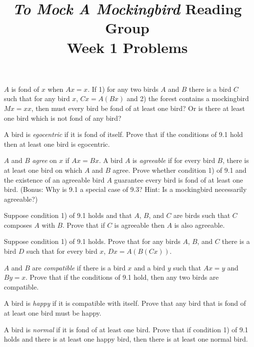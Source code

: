 \documentclass[12pt, letterpaper]{article}
\title{\emph{To Mock A Mockingbird} Reading Group\\Week 1 Problems}
\begin{document}
\maketitle

\disclaimer

\begin{prob}{9.1}
$A$ is fond of $x$ when $Ax = x$. If 1) for any two birds $A$ and $B$ there is a bird $C$ such that for any bird $x$, $Cx = A(Bx)$ and 2) the forest contains a mockingbird $Mx = xx$, then must every bird be fond of at least one bird? Or is there at least one bird which is not fond of any bird?
\end{prob}

\begin{prob}{9.2}
A bird is \emph{egocentric} if it is fond of itself. Prove that if the conditions of 9.1 hold then at least one bird is egocentric.
\end{prob}

\begin{prob}{9.3}
$A$ and $B$ \emph{agree} on $x$ if $Ax = Bx$. A bird $A$ is \emph{agreeable} if for every bird $B$, there is at least one bird on which $A$ and $B$ agree. Prove whether condition 1) of 9.1 and the existence of an agreeable bird $A$ guarantee every bird is fond of at least one bird. (Bonus: Why is 9.1 a special case of 9.3? Hint: Is a mockingbird necessarily agreeable?)
\end{prob}

\begin{prob}{9.4}
Suppose condition 1) of 9.1 holds and that $A$, $B$, and $C$ are birds such that $C$ composes $A$ with $B$. Prove that if $C$ is agreeable then $A$ is also agreeable.
\end{prob}

\begin{prob}{9.5}
Suppose condition 1) of 9.1 holds. Prove that for any birds $A$, $B$, and $C$ there is a bird $D$ such that for every bird $x$, $Dx = A(B(Cx))$.
\end{prob}

\begin{prob}{9.6}
$A$ and $B$ are \emph{compatible} if there is a bird $x$ and a bird $y$ such that $Ax = y$ and $By = x$. Prove that if the conditions of 9.1 hold, then any two birds are compatible.
\end{prob}

\begin{prob}{9.7}
A bird is \emph{happy} if it is compatible with itself. Prove that any bird that is fond of at least one bird must be happy.
\end{prob}

\begin{prob}{9.8}
A bird is \emph{normal} if it is fond of at least one bird. Prove that if condition 1) of 9.1 holds and there is at least one happy bird, then there is at least one normal bird.
\end{prob}
\end{document}
